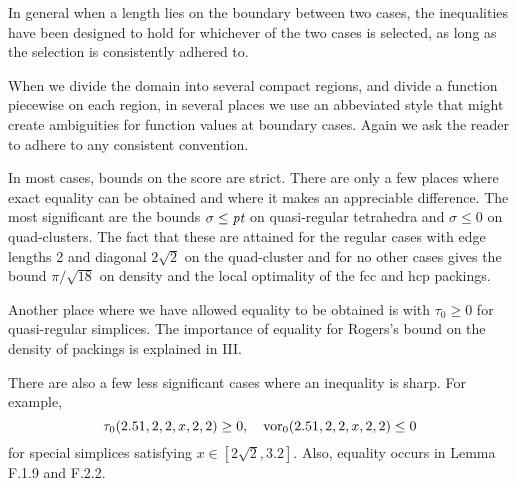 In general when a length lies on the boundary between
two cases,  the inequalities have been designed
to hold for whichever of the two cases is selected, as long as
the selection is consistently adhered to.

When we divide the domain into several compact regions, and
divide a function piecewise on each region,  in several places
we use an abbeviated style that might create ambiguities for function
values at boundary cases.  Again we ask the reader to adhere
to any consistent convention.  

\smallskip
In most cases, bounds on the score are strict.
There are only a few places where exact equality can be obtained
and where it makes an appreciable difference.
The most significant are the bounds $\sigma\le\hbox{\it pt}$ on
quasi-regular tetrahedra and $\sigma\le0$ on quad-clusters.
The fact that these are attained for the regular cases with edge
lengths 2 and diagonal $2\sqrt{2}$ on the quad-cluster and for
no other cases gives the bound $\pi/\sqrt{18}$ on density and
the local optimality of the fcc and hcp packings.

Another place where we have allowed equality to be obtained is
with $\tau_0\ge0$ for quasi-regular simplices.  The importance
of equality for Rogers's bound on the density of packings is explained
in III.

There are also a few less significant cases where an inequality
is sharp.
For example, $$\tau_0(2.51,2,2,x,2,2)\ge0, \quad\operatorname{vor}_0(2.51,2,2,x,2,2)\le0$$
for special simplices satisfying
 $x\in[2\sqrt{2},3.2]$.  Also, equality occurs in Lemma
F.1.9 and F.2.2.





\bye
